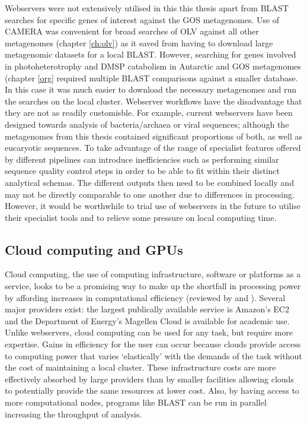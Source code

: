 Webservers were not extensively utilised in this this thesis apart from \acs{BLAST} searches for specific genes of interest against the \acs{GOS} metagenomes.
Use of \ac{CAMERA} was convenient for broad searches of \ac{OLV} against all other metagenomes (chapter \ref{ch:olv}) as it saved from having to download large metagenomic datasets for a local \acs{BLAST}.
However, searching for genes involved in photoheterotrophy and \ac{DMSP} catabolism in Antarctic and \acs{GOS} metagenomes (chapter \ref{org} required multiple \acs{BLAST} comparisons against a smaller database.
In this case it was much easier to download the necessary metagenomes and run the searches on the local cluster.
Webserver workflows have the disadvantage that they are not as readily customisble.
For example, current webservers have been designed towards analysis of bacteria/archaea or viral sequences; although the metagenomes from this thesis contained significant proportions of both, as well as eucaryotic sequences.
To take advantage of the range of specialist features offered by different pipelines can introduce inefficiencies such as performing similar sequence quality control steps in order to be able to fit within their distinct analytical schemas. 
The different outputs then need to be combined locally and may not be directly comparable to one another due to differences in processing.
However, it would be worthwhile to trial use of webservers in the future to utilise their specialist tools and to relieve some pressure on local computing time.

\subsection{Cloud computing and \acs{GPU}s}
Cloud computing, the use of computing infrastructure, software or platforms as a service, looks to be a promising way to make up the shortfall in processing power by affording increases in computational efficiency (reviewed by \citet{Schatz2010} and \citet{Thakur2012}).
Several major providers exist: the largest publically available service is Amazon's \ac{EC2} and the Department of Energy's Magellen Cloud is available for academic use.
Unlike webservers, cloud computing can be used for any task, but require more expertise.
Gains in efficiency for the user can occur because clouds provide access to computing power that varies `elastically' with the demands of the task without the cost of maintaining a local cluster.
These infrastructure costs are more effectively absorbed by large providers than by smaller facilities allowing clouds to potentially provide the same resources at lower cost.
Also, by having access to more computational nodes, programs like \acs{BLAST} can be run in parallel increasing the throughput of analysis.

